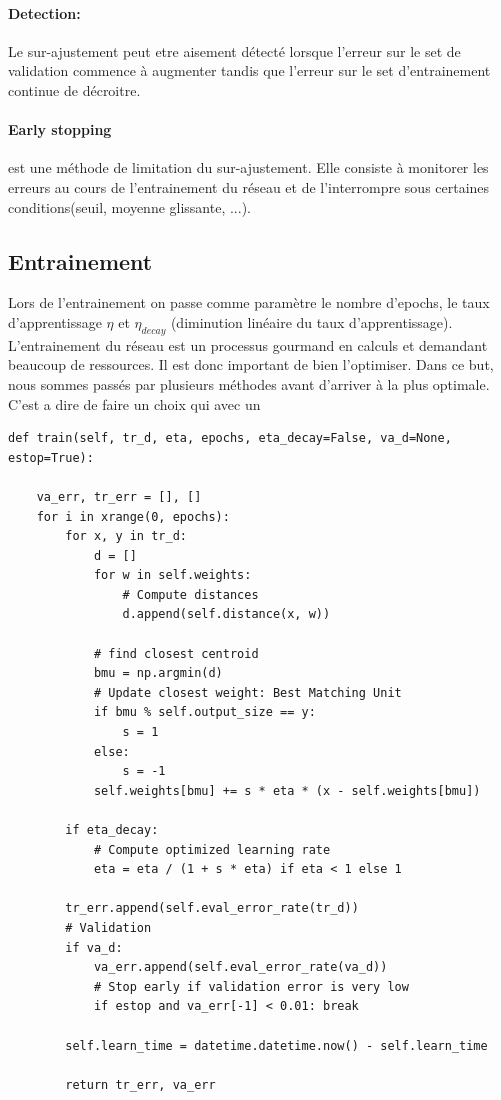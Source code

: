 \documentclass[11pt]{article}
\begin{document}
\paragraph{Detection: }Le sur-ajustement peut etre aisement d\'etect\'e lorsque
l'erreur sur le set de validation commence \`a augmenter tandis que l'erreur sur
le set d'entrainement continue de d\'ecroitre.

\paragraph{Early stopping} est une m\'ethode de limitation du sur-ajustement. Elle
consiste \`a monitorer les erreurs au cours de l'entrainement du r\'eseau et
de l'interrompre sous certaines conditions(seuil, moyenne glissante, ...).

\newpage
\subsection{Entrainement}
Lors de l'entrainement on passe comme param\`etre le nombre d'epochs, le taux d'apprentissage $\eta$ et $\eta_{decay}$ (diminution lin\'eaire du taux d'apprentissage).
L'entrainement du r\'eseau est un processus gourmand en calculs et demandant
beaucoup de ressources. Il est donc important de bien l'optimiser. Dans ce but,
nous sommes pass\'es par plusieurs m\'ethodes avant d'arriver \`a la plus optimale. C'est a dire de faire un choix qui avec un 



\begin{lstlisting}
def train(self, tr_d, eta, epochs, eta_decay=False, va_d=None, estop=True):
	
	va_err, tr_err = [], []
	for i in xrange(0, epochs):
		for x, y in tr_d:
		    d = []
		    for w in self.weights:
		        # Compute distances
		        d.append(self.distance(x, w))

		    # find closest centroid
		    bmu = np.argmin(d)
		    # Update closest weight: Best Matching Unit
		    if bmu % self.output_size == y: 
		    	s = 1
		    else: 
		    	s = -1
		    self.weights[bmu] += s * eta * (x - self.weights[bmu])
		    
		if eta_decay:
            # Compute optimized learning rate
            eta = eta / (1 + s * eta) if eta < 1 else 1
            
        tr_err.append(self.eval_error_rate(tr_d))
        # Validation
        if va_d:
            va_err.append(self.eval_error_rate(va_d))
            # Stop early if validation error is very low
            if estop and va_err[-1] < 0.01: break

        self.learn_time = datetime.datetime.now() - self.learn_time
        
        return tr_err, va_err
\end{lstlisting}
\end{document}
